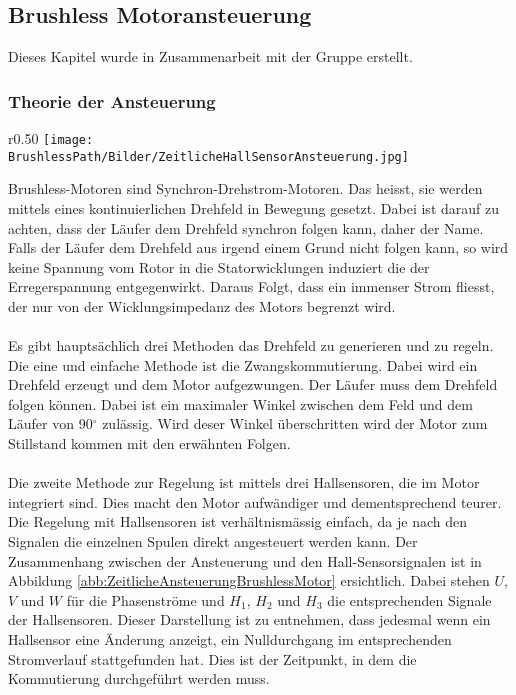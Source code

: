 \subsection{Brushless Motoransteuerung}
    Dieses Kapitel wurde in Zusammenarbeit mit der Gruppe \DasAndereTeam erstellt. 
    \subsubsection{Theorie der Ansteuerung}
        \begin{wrapfigure}{r}{0.50\textwidth}
           	\texttt{[image: \\BrushlessPath/Bilder/ZeitlicheHallSensorAnsteuerung.jpg]}
           	\caption[Zeitliche Darstellung der Ansteuerung mit Hall-Sensoren]{Zeitliche Darstellung der Ansteuerung mit Hall-Sensoren \cite{AppNote:BrushlessuC}}
           	\centering
            \label{abb:ZeitlicheAnsteuerungBrushlessMotor}
        \end{wrapfigure}
        Brushless-Motoren sind Synchron-Drehstrom-Motoren. Das heisst, sie werden mittels eines kontinuierlichen Drehfeld in Bewegung gesetzt. Dabei ist darauf zu achten, dass der Läufer dem Drehfeld synchron folgen kann, daher der Name. Falls der Läufer dem Drehfeld aus irgend einem Grund nicht folgen kann, so wird keine Spannung vom Rotor in die Statorwicklungen induziert die der Erregerspannung entgegenwirkt. Daraus Folgt, dass ein immenser Strom fliesst, der nur von der Wicklungsimpedanz des Motors begrenzt wird.\\
        \\
        Es gibt hauptsächlich drei Methoden das Drehfeld zu generieren und zu regeln. Die eine und einfache Methode ist die Zwangskommutierung. Dabei wird ein Drehfeld erzeugt und dem Motor aufgezwungen. Der Läufer muss dem Drehfeld folgen können. Dabei ist ein maximaler Winkel zwischen dem Feld und dem Läufer von 90$^\circ$  zulässig. Wird deser Winkel überschritten wird der Motor zum Stillstand kommen mit den erwähnten Folgen.\\
        \\
        Die zweite Methode zur Regelung ist mittels drei Hallsensoren, die im Motor integriert sind. Dies macht den Motor aufwändiger und dementsprechend teurer. Die Regelung mit Hallsensoren ist verhältnismässig einfach, da je nach den Signalen die einzelnen Spulen direkt angesteuert werden kann. Der Zusammenhang zwischen der Ansteuerung und den Hall-Sensorsignalen ist in Abbildung \ref{abb:ZeitlicheAnsteuerungBrushlessMotor} ersichtlich. Dabei stehen $U$, $V$ und $W$ für die Phasenströme und $H_1$, $H_2$ und $H_3$ die entsprechenden Signale der Hallsensoren. Dieser Darstellung ist zu entnehmen, dass jedesmal wenn ein Hallsensor eine Änderung anzeigt, ein Nulldurchgang im entsprechenden Stromverlauf stattgefunden hat. Dies ist der Zeitpunkt, in dem die Kommutierung durchgeführt werden muss.\\

